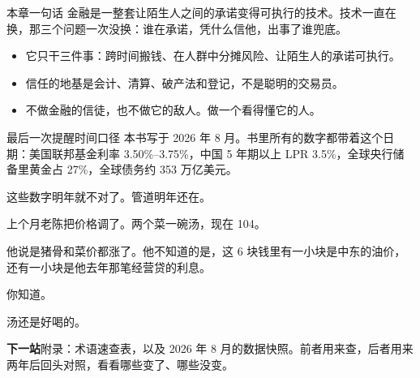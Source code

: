 \begin{takeaway}{本章一句话}
金融是一整套让陌生人之间的承诺变得可执行的技术。技术一直在换，那三个问题一次没换：谁在承诺，凭什么信他，出事了谁兜底。

\begin{itemize}
  \item 它只干三件事：跨时间搬钱、在人群中分摊风险、让陌生人的承诺可执行。
  \item 信任的地基是会计、清算、破产法和登记，不是聪明的交易员。
  \item 不做金融的信徒，也不做它的敌人。做一个看得懂它的人。
\end{itemize}

\end{takeaway}

\begin{databox}{最后一次提醒时间口径}
本书写于 2026 年 8 月。书里所有的数字都带着这个日期：美国联邦基金利率 3.50\%–3.75\%，中国 5 年期以上 LPR 3.5\%，全球央行储备里黄金占 27\%，全球债务约 353 万亿美元。

这些数字明年就不对了。管道明年还在。

\end{databox}

上个月老陈把价格调了。两个菜一碗汤，现在 104。

他说是猪骨和菜价都涨了。他不知道的是，这 6 块钱里有一小块是中东的油价，还有一小块是他去年那笔经营贷的利息。

你知道。

汤还是好喝的。

\begin{bridgebox}
\textbf{下一站}附录：术语速查表，以及 2026 年 8 月的数据快照。前者用来查，后者用来两年后回头对照，看看哪些变了、哪些没变。
\end{bridgebox}

